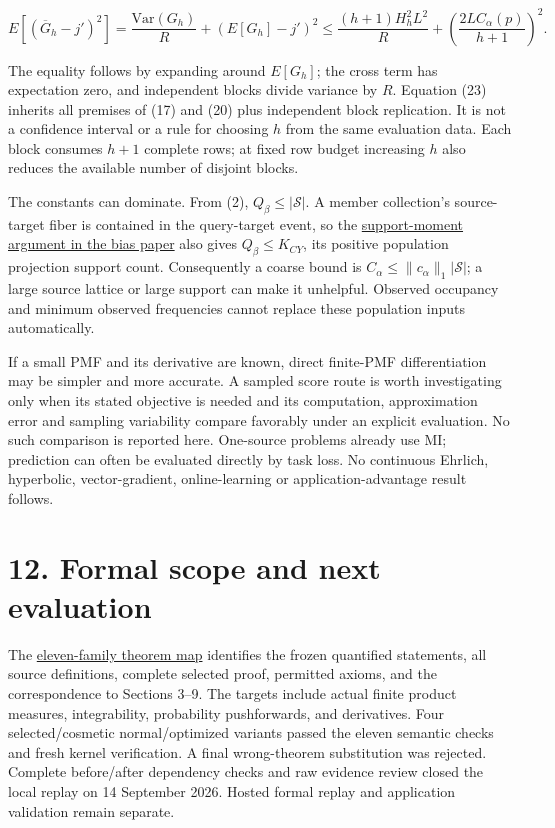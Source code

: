 \documentclass[11pt,a4paper]{article}
\begin{document}
\[
E[(\overline G_h-j')^2]
=\frac{\mathrm{Var}(G_h)}R+(E[G_h]-j')^2
\le\frac{(h+1)H_h^2L^2}{R}
+\left(\frac{2LC_\alpha(p)}{h+1}\right)^2. \tag{23}
\]

The equality follows by expanding around \(E[G_h]\); the cross term has expectation zero, and independent blocks divide variance by \(R\). Equation (23) inherits all premises of (17) and (20) plus independent block replication. It is not a confidence interval or a rule for choosing \(h\) from the same evaluation data. Each block consumes \(h+1\) complete rows; at fixed row budget increasing \(h\) also reduces the available number of disjoint blocks.

The constants can dominate. From (2), \(Q_\beta\le|\mathcal S|\). A member collection's source-target fiber is contained in the query-target event, so the \href{https://github.com/sepahead/pid-rs/blob/main/audit/formal/lean-prefix-mgw-bias/EXPOSITION.md}{support-moment argument in the bias paper} also gives \(Q_\beta\le K_{CY}\), its positive population projection support count. Consequently a coarse bound is \(C_\alpha\le\|c_\alpha\|_1|\mathcal S|\); a large source lattice or large support can make it unhelpful. Observed occupancy and minimum observed frequencies cannot replace these population inputs automatically.

If a small PMF and its derivative are known, direct finite-PMF differentiation may be simpler and more accurate. A sampled score route is worth investigating only when its stated objective is needed and its computation, approximation error and sampling variability compare favorably under an explicit evaluation. No such comparison is reported here. One-source problems already use MI; prediction can often be evaluated directly by task loss. No continuous Ehrlich, hyperbolic, vector-gradient, online-learning or application-advantage result follows.

\section{12. Formal scope and next evaluation}\label{formal-scope-and-next-evaluation}

The \href{https://github.com/sepahead/pid-rs/blob/main/audit/formal/lean-prefix-mgw-gradient/THEOREM_MAP.md}{eleven-family theorem map} identifies the frozen quantified statements, all source definitions, complete selected proof, permitted axioms, and the correspondence to Sections 3--9. The targets include actual finite product measures, integrability, probability pushforwards, and derivatives. Four selected/cosmetic normal/optimized variants passed the eleven semantic checks and fresh kernel verification. A final wrong-theorem substitution was rejected. Complete before/after dependency checks and raw evidence review closed the local replay on 14 September 2026. Hosted formal replay and application validation remain separate.
\end{document}
